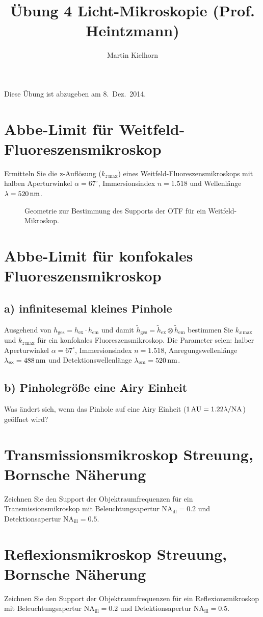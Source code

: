 \documentclass{article}
\begin{document}
\author{Martin Kielhorn}
\title{\"Ubung 4 Licht-Mikroskopie (Prof. Heintzmann)}
\maketitle
\noindent Diese \"Ubung ist abzugeben am 8.~Dez.~2014.

\section{Abbe-Limit f\"ur Weitfeld-Fluoreszensmikroskop}
Ermitteln Sie die z-Aufl\"osung ($k_{z\,\textrm{max}}$) eines
Weitfeld-Fluoreszensmikroskops mit halben Aperturwinkel
$\alpha=67^\circ$, Immersionsindex $n=1.518$ und Wellenl\"ange
$\lambda=\unit[520]{nm}$.

\begin{figure}[htbp]
  \centering
  
  \caption{Geometrie zur Bestimmung des Supports der OTF f\"ur ein Weitfeld-Mikroskop.}
  \label{fig:missing-cone}
\end{figure}


\section{Abbe-Limit f\"ur konfokales Fluoreszensmikroskop}
\subsection*{a) infinitesemal kleines Pinhole}
Ausgehend von $h_\textrm{ges}=h_\textrm{ex}\cdot h_\textrm{em}$ und
damit
$\widetilde h_\textrm{ges}=\widetilde h_\textrm{ex}\otimes\widetilde
h_\textrm{em}$
bestimmen Sie $k_{x\,\textrm{max}}$ und $k_{z\,\textrm{max}}$ f\"ur
ein konfokales Fluoreszensmikroskop. Die Parameter seien: halber
Aperturwinkel $\alpha=67^\circ$, Immersionsindex $n=1.518$,
Anregungswellenl\"ange $\lambda_\textrm{ex}=\unit[488]{nm}$ und
Detektionswellenl\"ange $\lambda_\textrm{em}=\unit[520]{nm}$.
\subsection*{b) Pinholegr\"o\ss e eine Airy Einheit}
Was \"andert sich, wenn das Pinhole auf eine Airy Einheit
($\unit[1]{AU}=1.22\lambda/\textrm{NA}$) ge\"offnet wird?

\section{Transmissionsmikroskop Streuung, Bornsche N\"aherung}
Zeichnen Sie den Support der Objektraumfrequenzen f\"ur ein
Transmissionsmikroskop mit Beleuchtungsapertur
$\textrm{NA}_\textrm{ill} = 0.2$ und Detektionsapertur
$\textrm{NA}_\textrm{ill} = 0.5$.
\section{Reflexionsmikroskop Streuung, Bornsche N\"aherung}
Zeichnen Sie den Support der Objektraumfrequenzen f\"ur ein
Reflexionsmikroskop mit Beleuchtungsapertur
$\textrm{NA}_\textrm{ill} = 0.2$ und Detektionsapertur
$\textrm{NA}_\textrm{ill} = 0.5$.
\end{document}
